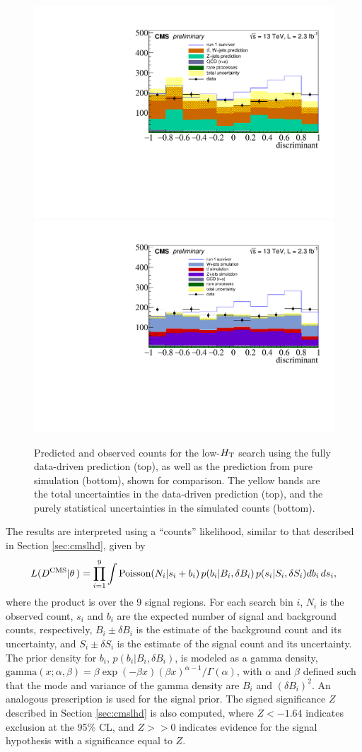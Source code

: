 \begin{figure}[tb!]
\centering
\includegraphics[width=0.65\linewidth]{figures/SusySearches/MvaSusy/ResultDD.pdf}\\
\includegraphics[width=0.65\linewidth]{figures/SusySearches/MvaSusy/ResultMC.pdf}
\caption{Predicted and observed counts for the low-$H_{\rm T}$ search using the fully data-driven prediction (top), as well as the prediction from pure simulation (bottom), shown for comparison. The yellow bands are the total uncertainties in the data-driven prediction (top), and the purely statistical uncertainties in the simulated counts (bottom).}
\label{fig:results}
\end{figure}
The results are interpreted using a ``counts'' likelihood, similar to that described in Section \ref{sec:cmslhd}, given by  
\begin{equation}
L(D^{\text{CMS}}|\theta\,) = \prod_{i=1}^9 \int \textrm{Poisson}(N_i | s_i+ b_i) \, p(b_i|B_i, \delta B_i) \, p(s_i|S_i, \delta S_i) db_i\, ds_i,
\label{eq:lhd_counts}
\end{equation}
where the product is over the 9 signal regions. For each search bin $i$, $N_i$ is the observed count,
$s_i$ and $b_i$ are the expected number of signal and background counts, respectively,
 $B_i \pm\delta B_i$ is the estimate of the background count and its uncertainty, and 
 $S_i \pm\delta S_i$ is the estimate of the signal count and its uncertainty.
The prior density for $b_i$, $p(b_i|B_i, \delta B_i)$, is modeled as a gamma density, 
$\textrm{gamma}(x;\alpha,\beta) = \beta \exp(-\beta x)  (\beta x)^{\alpha-1}/\Gamma(\alpha)$,
with $\alpha$ and $\beta$ defined such that the mode and variance of the gamma density are 
$B_i$ and $(\delta B_i)^2$. An analogous prescription is used for the signal prior. 
The signed significance $Z$ described in Section \ref{sec:cmslhd} is also computed, where $Z<-1.64$ indicates exclusion at the
95\% CL, and $Z>>0$ indicates evidence for the signal hypothesis with a significance equal to $Z$.

